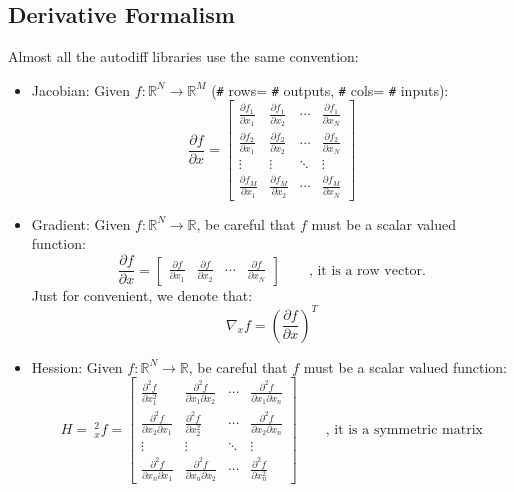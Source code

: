 \begin{itemize}
\subsection{Derivative Formalism}
Almost all the autodiff libraries use the same convention:
\begin{itemize}
    \item Jacobian: Given $f:\mathbb{R}^{N}\rightarrow \mathbb{R}^{M}$ (\verb|#| rows= \verb|#| outputs, \verb|#| cols= \verb|#| inputs):
    \begin{equation}
        \frac{\partial f}{\partial x} =\begin{bmatrix}
            \frac{\partial f_{1}}{\partial x_{1}} & \frac{\partial f_{1}}{\partial x_{2}} & \cdots  & \frac{\partial f_{1}}{\partial x_{N}}\\
            \frac{\partial f_{2}}{\partial x_{1}} & \frac{\partial f_{2}}{\partial x_{2}} & \cdots  & \frac{\partial f_{2}}{\partial x_{N}}\\
            \vdots  & \vdots  & \ddots  & \vdots \\
            \frac{\partial f_{M}}{\partial x_{1}} & \frac{\partial f_{M}}{\partial x_{2}} & \cdots  & \frac{\partial f_{M}}{\partial x_{N}}
        \end{bmatrix}
    \end{equation}
    \item Gradient: Given $f:\mathbb{R}^{N}\rightarrow \mathbb{R}$, be careful that $f$ must be a scalar valued function:
    \begin{equation}
        \frac{\partial f}{\partial x} =\begin{bmatrix}
            \frac{\partial f}{\partial x_{1}} & \frac{\partial f}{\partial x_{2}} & \cdots  & \frac{\partial f}{\partial x_{N}}
        \end{bmatrix} \qquad \text{, it is a row vector.}
    \end{equation}
    Just for convenient, we denote that:
    \begin{equation}
        \nabla_x f = \left(\frac{\partial f}{\partial x}\right)^T
    \end{equation}
    \item Hession: Given $f:\mathbb{R}^{N}\rightarrow \mathbb{R}$, be careful that $f$ must be a scalar valued function:
    \begin{equation}
        H = \ _x^2 f = \begin{bmatrix}
        \frac{\partial^2 f}{\partial x_1^2} & \frac{\partial^2 f}{\partial x_1 \partial x_2} & \cdots & \frac{\partial^2 f}{\partial x_1 \partial x_n} \\
        \frac{\partial^2 f}{\partial x_2 \partial x_1} & \frac{\partial^2 f}{\partial x_2^2} & \cdots & \frac{\partial^2 f}{\partial x_2 \partial x_n} \\
        \vdots & \vdots & \ddots & \vdots \\
        \frac{\partial^2 f}{\partial x_n \partial x_1} & \frac{\partial^2 f}{\partial x_n \partial x_2} & \cdots & \frac{\partial^2 f}{\partial x_n^2}
        \end{bmatrix} \qquad \text{, it is a symmetric matrix}
    \end{equation}
\end{itemize}

\end{itemize}
